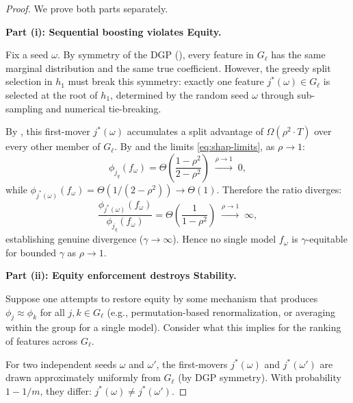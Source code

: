 \documentclass[11pt]{article}
\theoremstyle{remark}
\newcommand{\Gl}{G_\ell}                    %
\newcommand{\phij}{\phi_j}                  %
\newcommand{\phik}{\phi_k}                  %
\newcommand{\totalT}{T}                     %
\newcommand{\rhovar}{\rho}                  %
\begin{document}
\begin{proof}
We prove both parts separately.

\medskip
\noindent\textbf{Part (i): Sequential boosting violates Equity.}

Fix a seed $\omega$.  By symmetry of the DGP
(), every feature in $\Gl$ has the same marginal
distribution and the same true coefficient.  However, the greedy split
selection in $h_1$ must break this symmetry: exactly one feature
$j^*(\omega) \in \Gl$ is selected at the root of $h_1$, determined by
the random seed $\omega$ through sub-sampling and numerical tie-breaking.

By , this first-mover $j^*(\omega)$
accumulates a split advantage of $\Omega(\rhovar^2 \cdot \totalT)$ over
every other member of $\Gl$.  By  and the limits
\eqref{eq:shap-limits}, as $\rhovar \to 1$:
\begin{equation}
  \phi_{j_q}(f_\omega) = \Theta\!\left(\frac{1-\rho^2}{2-\rho^2}\right)
  \;\xrightarrow{\rho\to 1}\; 0,
\end{equation}
while $\phi_{j^*(\omega)}(f_\omega) = \Theta(1/(2-\rho^2)) \to \Theta(1)$.
Therefore the ratio diverges:
\begin{equation}
  \frac{\phi_{j^*(\omega)}(f_\omega)}{\phi_{j_q}(f_\omega)}
  = \Theta\!\left(\frac{1}{1-\rho^2}\right) \;\xrightarrow{\rho\to 1}\; \infty,
\end{equation}
establishing genuine divergence ($\gamma \to \infty$).  Hence no single
model $f_\omega$ is $\gamma$-equitable for bounded $\gamma$ as
$\rhovar \to 1$.

\medskip
\noindent\textbf{Part (ii): Equity enforcement destroys Stability.}

Suppose one attempts to restore equity by some mechanism that produces
$\phij \approx \phik$ for all $j, k \in \Gl$ (e.g., permutation-based
renormalization, or averaging within the group for a single model).
Consider what this implies for the ranking of features across $\Gl$.

For two independent seeds $\omega$ and $\omega'$, the first-movers
$j^*(\omega)$ and $j^*(\omega')$ are drawn approximately uniformly from
$\Gl$ (by DGP symmetry).  With probability $1 - 1/m$, they differ:
$j^*(\omega) \neq j^*(\omega')$.


\end{proof}
\end{document}
